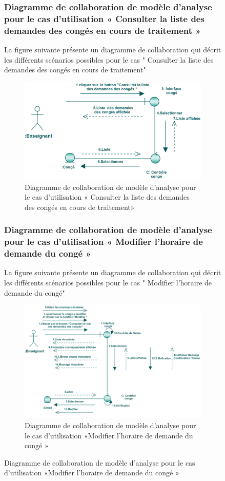\documentclass[12 pt]{report}
\begin{document}
\begin{figure}[h]
\begin{center}
\subsubsection{Diagramme  de  collaboration  de  modèle  d'analyse  pour  le  cas  d'utilisation « Consulter la liste des demandes des congés en cours de traitement »  }
La figure suivante présente un diagramme de collaboration qui décrit les différents
scénarios possibles pour le cas " Consulter la liste des demandes des congés en cours de traitement"
\begin{figure}[h]
\begin{center}
\includegraphics[width= 12 cm , height =3.5 cm]{collaconscontrai.PNG}
 \caption{Diagramme  de  collaboration  de  modèle  d'analyse  pour  le  cas  d'utilisation « Consulter la liste des demandes des congés en cours de traitement»}
\end{center}
\end{figure}
\subsubsection{Diagramme  de  collaboration  de  modèle  d'analyse  pour  le  cas  d'utilisation « Modifier l'horaire de  demande du  congé »  }
La figure suivante présente un diagramme de collaboration qui décrit les différents
scénarios possibles pour le cas " Modifier l'horaire de   demande du  congé"
\begin{figure}[h]
\begin{center}
\includegraphics[width= 14cm , height =5.4 cm]{colla_ens_modifierconge.PNG}
 \caption{Diagramme  de  collaboration  de  modèle  d'analyse  pour  le  cas  d'utilisation «Modifier l'horaire de   demande du  congé »}
\end{center}
\end{figure}

\end{center}
\end{figure}
\end{document}
